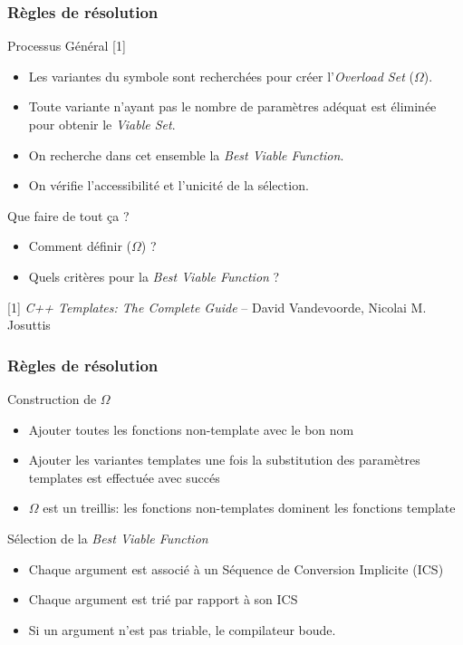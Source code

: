 \documentclass[svgnames]{beamer}
\begin{document}
\begin{frame}
\frametitle{Règles de résolution}
\begin{block}{Processus Général [1]}
\footnotesize
\begin{itemize}
\item Les variantes du symbole sont recherchées pour créer l'\emph{Overload Set} ($\Omega$).
\item Toute variante n'ayant pas le nombre de paramètres adéquat est éliminée pour obtenir le \emph{Viable Set}.
\item On recherche dans cet ensemble la \emph{Best Viable Function}.
\item On vérifie l'accessibilité et l'unicité de la sélection.
\end{itemize}
\end{block}

\begin{block}{Que faire de tout ça ?}
\footnotesize
\begin{itemize}
\item Comment définir ($\Omega$) ?
\item Quels critères pour la \emph{Best Viable Function} ?
\end{itemize}
\end{block}

\tiny{[1] \textit{C++ Templates: The Complete Guide} -- David Vandevoorde, Nicolai M. Josuttis}

\end{frame}

\begin{frame}
\frametitle{Règles de résolution}
\begin{block}{Construction de $\Omega$}
\begin{itemize}\footnotesize
\item Ajouter toutes les fonctions non-template avec le bon nom
\item Ajouter les variantes templates une fois la substitution des paramètres templates est 
effectuée avec succés
\item $\Omega$ est un treillis: les fonctions non-templates dominent les fonctions template
\end{itemize}
\end{block}

\begin{block}{Sélection de la \emph{Best Viable Function}}
\begin{itemize}
\footnotesize
\item Chaque argument est associé à un Séquence de Conversion Implicite (ICS)
\item Chaque argument est trié par rapport à son ICS
\item Si un argument n'est pas triable, le compilateur boude.
\end{itemize}
\end{block}

\end{frame}
\end{document}
